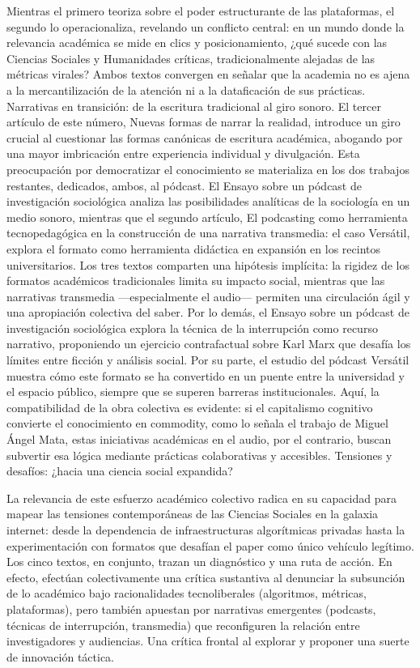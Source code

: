 \documentclass[
  spanish,
  11pt,
  a4paper,
]{scrbook}
\begin{document}
Mientras el primero teoriza sobre el poder estructurante de las
plataformas, el segundo lo operacionaliza, revelando un conflicto
central: en un mundo donde la relevancia académica se mide en clics y
posicionamiento, ¿qué sucede con las Ciencias Sociales y Humanidades
críticas, tradicionalmente alejadas de las métricas virales? Ambos
textos convergen en señalar que la academia no es ajena a la
mercantilización de la atención ni a la dataficación de sus prácticas.
Narrativas en transición: de la escritura tradicional al giro sonoro. El
tercer artículo de este número, Nuevas formas de narrar la realidad,
introduce un giro crucial al cuestionar las formas canónicas de
escritura académica, abogando por una mayor imbricación entre
experiencia individual y divulgación. Esta preocupación por democratizar
el conocimiento se materializa en los dos trabajos restantes, dedicados,
ambos, al pódcast. El Ensayo sobre un pódcast de investigación
sociológica analiza las posibilidades analíticas de la sociología en un
medio sonoro, mientras que el segundo artículo, El podcasting como
herramienta tecnopedagógica en la construcción de una narrativa
transmedia: el caso Versátil, explora el formato como herramienta
didáctica en expansión en los recintos universitarios. Los tres textos
comparten una hipótesis implícita: la rigidez de los formatos académicos
tradicionales limita su impacto social, mientras que las narrativas
transmedia ---especialmente el audio--- permiten una circulación ágil y
una apropiación colectiva del saber. Por lo demás, el Ensayo sobre un
pódcast de investigación sociológica explora la técnica de la
interrupción como recurso narrativo, proponiendo un ejercicio
contrafactual sobre Karl Marx que desafía los límites entre ficción y
análisis social. Por su parte, el estudio del pódcast Versátil muestra
cómo este formato se ha convertido en un puente entre la universidad y
el espacio público, siempre que se superen barreras institucionales.
Aquí, la compatibilidad de la obra colectiva es evidente: si el
capitalismo cognitivo convierte el conocimiento en commodity, como lo
señala el trabajo de Miguel Ángel Mata, estas iniciativas académicas en
el audio, por el contrario, buscan subvertir esa lógica mediante
prácticas colaborativas y accesibles. Tensiones y desafíos: ¿hacia una
ciencia social expandida?

La relevancia de este esfuerzo académico colectivo radica en su
capacidad para mapear las tensiones contemporáneas de las Ciencias
Sociales en la galaxia internet: desde la dependencia de
infraestructuras algorítmicas privadas hasta la experimentación con
formatos que desafían el paper como único vehículo legítimo. Los cinco
textos, en conjunto, trazan un diagnóstico y una ruta de acción. En
efecto, efectúan colectivamente una crítica sustantiva al denunciar la
subsunción de lo académico bajo racionalidades tecnoliberales
(algoritmos, métricas, plataformas), pero también apuestan por
narrativas emergentes (podcasts, técnicas de interrupción, transmedia)
que reconfiguren la relación entre investigadores y audiencias. Una
crítica frontal al explorar y proponer una suerte de innovación táctica.
\end{document}
